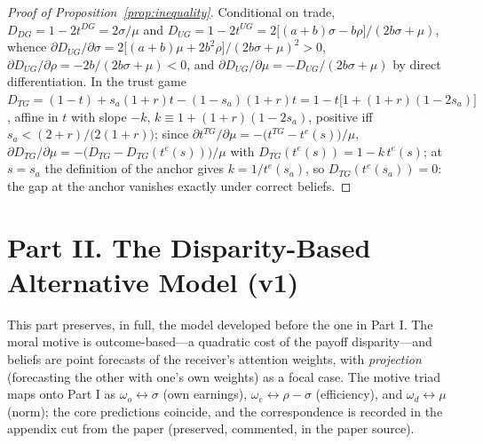 \documentclass[11pt]{article}
\theoremstyle{plain}
\theoremstyle{remark}
\begin{document}
\begin{proof}[Proof of Proposition~\ref{prop:inequality}]
Conditional on trade, $D_{DG}=1-2t^{DG}=2\sigma/\mu$ and $D_{UG}=1-2t^{UG}=2\bigl[(a+b)\sigma-b\rho\bigr]/(2b\sigma+\mu)$, whence $\partial D_{UG}/\partial\sigma=2\bigl[(a+b)\mu+2b^{2}\rho\bigr]/(2b\sigma+\mu)^{2}>0$, $\partial D_{UG}/\partial\rho=-2b/(2b\sigma+\mu)<0$, and $\partial D_{UG}/\partial\mu=-D_{UG}/(2b\sigma+\mu)$ by direct differentiation. In the trust game $D_{TG}=(1-t)+s_a(1+r)t-(1-s_a)(1+r)t=1-t\bigl[1+(1+r)(1-2s_a)\bigr]$, affine in $t$ with slope $-k$, $k\equiv1+(1+r)(1-2s_a)$, positive iff $s_a<(2+r)/\bigl(2(1+r)\bigr)$; since $\partial t^{TG}/\partial\mu=-\bigl(t^{TG}-t^{e}(s)\bigr)/\mu$, $\partial D_{TG}/\partial\mu=-\bigl(D_{TG}-D_{TG}(t^{e}(s))\bigr)/\mu$ with $D_{TG}(t^{e}(s))=1-k\,t^{e}(s)$; at $s=s_{a}$ the definition of the anchor gives $k=1/t^{e}(s_{a})$, so $D_{TG}(t^{e}(s_{a}))=0$: the gap at the anchor vanishes exactly under correct beliefs.
\end{proof}


\clearpage
\part*{Part II. The Disparity-Based Alternative Model (v1)}

\noindent This part preserves, in full, the model developed before the one in Part I. The moral motive is outcome-based---a quadratic cost of the payoff disparity---and beliefs are point forecasts of the receiver's attention weights, with \emph{projection} (forecasting the other with one's own weights) as a focal case. The motive triad maps onto Part I as $\omega_o\leftrightarrow\sigma$ (own earnings), $\omega_e\leftrightarrow\rho-\sigma$ (efficiency), and $\omega_d\leftrightarrow\mu$ (norm); the core predictions coincide, and the correspondence is recorded in the appendix cut from the paper (preserved, commented, in the paper source).
\end{document}
